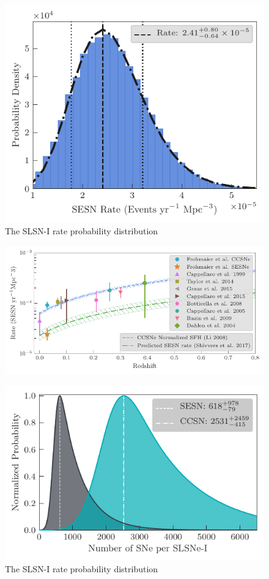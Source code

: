 \documentclass[a4paper,fleqn,usenatbib]{mnras}
\begin{document}
\begin{figure}
	\includegraphics[width=\linewidth]{./SESN_Rate.pdf}
    \caption{The SLSN-I rate probability distribution}
    \label{fig:SESNrateProbDist}
\end{figure}

\begin{figure}
	\includegraphics[width=\linewidth]{./allCC_Compare_Literature.pdf}
    \caption{}
    \label{fig:rates_CC_lit}
\end{figure}

\begin{figure}
	\includegraphics[width=\linewidth]{./bothRateCompare.pdf}
    \caption{The SLSN-I rate probability distribution}
    \label{fig:compare2SLSN}
\end{figure}
\end{document}
